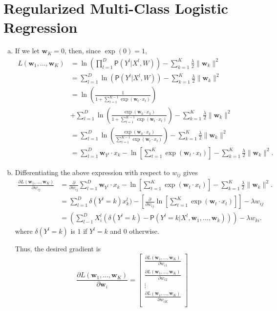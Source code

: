 \documentclass[11pt]{article}
\newcommand{\bw}{\mathbf{w}}
\newcommand{\pr}[1]{\mathsf{P}\left( #1 \right)} %
\begin{document}
\section{Regularized Multi-Class Logistic Regression}
\begin{enumerate}[a.]
\item If we let $\bw_K = 0$, then, since $\exp(0) = 1$,
\begin{align*}
L(\bw_1,\dots,\bw_K)
 & = \ln \left( \prod_{l = 1}^D \pr{Y^l | X^l,W} \right) - \sum_{k = 1}^K \frac{\lambda}{2}\|\bw_k\|^2 \\
 & = \sum_{l = 1}^D \ln(\pr{Y^l | X^l,W}) - \sum_{k = 1}^K \frac{\lambda}{2}\|\bw_k\|^2 \\
 & =                      \ln\left( \frac{1}{1 + \sum_{t = 1}^{K - 1}\exp(\bw_t \cdot x_t)} \right) \\
 & + \sum_{l = 1}^D \ln\left( \frac{\exp(\bw_k \cdot x_k)}{1 + \sum_{t = 1}^{K - 1}\exp(\bw_t \cdot x_t)} \right) - \sum_{k = 1}^K \frac{\lambda}{2}\|\bw_k\|^2 \\
 & = \sum_{l = 1}^D \ln\left( \frac{\exp(\bw_k \cdot x_k)}{\sum_{t = 1}^{K - 1}\exp(\bw_t \cdot x_t)} \right) - \sum_{k = 1}^K \frac{\lambda}{2}\|\bw_k\|^2 \\
 & = \sum_{l = 1}^D \bw_{Y^l} \cdot x_k - \ln \left[ \sum_{t = 1}^K\exp(\bw_t \cdot x_t)\right] - \sum_{k = 1}^K \frac{\lambda}{2}\|\bw_k\|^2.
\end{align*}

\item Differentiating the above expression with respect to $w_{ij}$ gives
\begin{align*}
\frac{\partial L(\bw_1,\dots,\bw_K)}{\partial w_{ij}}
 & = \frac{\partial}{\partial w_{ij}}
 \sum_{l = 1}^D \bw_{Y^l} \cdot x_k - \ln \left[ \sum_{t = 1}^K\exp(\bw_t \cdot x_t)\right] - \sum_{k = 1}^K \frac{\lambda}{2}\|\bw_k\|^2. \\
 & = \sum_{l = 1}^D \delta(Y^l = k)x_k^l) - \left[\frac{\partial}{\partial w_{ij}} \ln \left[ \sum_{t = 1}^K\exp(\bw_t \cdot x_t)\right]\right] - \lambda w_{ij} \\
 & = \left(\sum_{l - 1}^D X_i^l\left(\delta(Y^l = k) - \pr{Y^l = k | X^l,\bw_1,\dots,\bw_k} \right) \right) - \lambda w_{ki}.
\end{align*}
where $\delta(Y^l = k)$ is $1$ if $Y^l = k$ and $0$ otherwise.

Thus, the desired gradient is
\[\frac{\partial L(\bw_1,\dots,\bw_K)}{\partial \bw_i}
 = \begin{bmatrix}
     \frac{\partial L(\bw_1,\dots,\bw_K)}{\partial w_{i1}} \\
     \frac{\partial L(\bw_1,\dots,\bw_K)}{\partial w_{i2}} \\
     \vdots                                                \\
     \frac{\partial L(\bw_1,\dots,\bw_K)}{\partial w_{iK}} \\
   \end{bmatrix}
\]


\end{enumerate}
\end{document}

